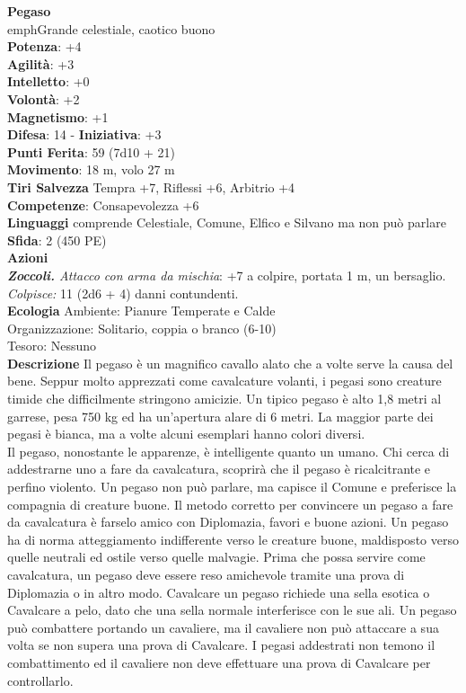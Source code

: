\begin{multicols}{2}
\medskip\textbf{Pegaso}\\
emph{Grande celestiale, caotico buono}\\
\textbf{Potenza}: +4\\
\textbf{Agilità}: +3\\
\textbf{Intelletto}: +0\\
\textbf{Volontà}: +2\\
\textbf{Magnetismo}: +1\\
\textbf{Difesa}: 14 - \textbf{Iniziativa}: +3\\
\textbf{Punti Ferita}: 59 (7d10 + 21)\\
\textbf{Movimento}: 18 m, volo 27 m\\
\textbf{Tiri Salvezza} Tempra +7, Riflessi +6, Arbitrio +4\\
\textbf{Competenze}: Consapevolezza +6\\
\textbf{Linguaggi} comprende Celestiale, Comune, Elfico e Silvano ma non può parlare\\
\textbf{Sfida}: 2 (450 PE)\smallskip\\
\smallskip\textbf{Azioni}\\
\emph{\textbf{Zoccoli.} Attacco con arma da mischia}: +7 a colpire, portata 1 m, un bersaglio.\\
\emph{Colpisce:} 11 (2d6 + 4) danni contundenti.\\
\textbf{Ecologia}
Ambiente: Pianure Temperate e Calde\\
Organizzazione: Solitario, coppia o branco (6-10)\\
Tesoro: Nessuno\\
\textbf{Descrizione}
Il pegaso è un magnifico cavallo alato che a volte serve la causa del bene. Seppur molto apprezzati come cavalcature volanti, i pegasi sono creature timide che difficilmente stringono amicizie. Un tipico pegaso è alto 1,8 metri al garrese, pesa 750 kg ed ha un’apertura alare di 6 metri. La maggior parte dei pegasi è bianca, ma a volte alcuni esemplari hanno colori diversi.\\

Il pegaso, nonostante le apparenze, è intelligente quanto un umano. Chi cerca di addestrarne uno a fare da cavalcatura, scoprirà che il pegaso è ricalcitrante e perfino violento. Un pegaso non può parlare, ma capisce il Comune e preferisce la compagnia di creature buone. Il metodo corretto per convincere un pegaso a fare da cavalcatura è farselo amico con Diplomazia, favori e buone azioni. Un pegaso ha di norma atteggiamento indifferente verso le creature buone, maldisposto verso quelle neutrali ed ostile verso quelle malvagie. Prima che possa servire come cavalcatura, un pegaso deve essere reso amichevole tramite una prova di Diplomazia o in altro modo. Cavalcare un pegaso richiede una sella esotica o Cavalcare a pelo, dato che una sella normale interferisce con le sue ali. Un pegaso può combattere portando un cavaliere, ma il cavaliere non può attaccare a sua volta se non supera una prova di Cavalcare. I pegasi addestrati non temono il combattimento ed il cavaliere non deve effettuare una prova di Cavalcare per controllarlo.\\


\end{multicols}
